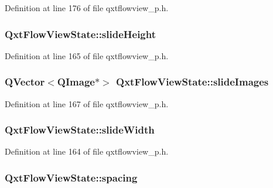 Definition at line 176 of file qxtflowview\-\_\-p.\-h.

\hypertarget{class_qxt_flow_view_state_ad99364d285780d8b4c2d4b50dbe86fdc}{
\subsubsection[{slide\-Height}]{ Qxt\-Flow\-View\-State\-::slide\-Height}}\label{class_qxt_flow_view_state_ad99364d285780d8b4c2d4b50dbe86fdc}


Definition at line 165 of file qxtflowview\-\_\-p.\-h.

\hypertarget{class_qxt_flow_view_state_ae0efba9dbd03593eca649060d96d0073}{
\subsubsection[{slide\-Images}]{\setlength{\rightskip}{0pt plus 5cm}Q\-Vector$<$Q\-Image$\ast$$>$ Qxt\-Flow\-View\-State\-::slide\-Images}}\label{class_qxt_flow_view_state_ae0efba9dbd03593eca649060d96d0073}


Definition at line 167 of file qxtflowview\-\_\-p.\-h.

\hypertarget{class_qxt_flow_view_state_a7f91c4d0a9c63db943552ab450c380b3}{
\subsubsection[{slide\-Width}]{ Qxt\-Flow\-View\-State\-::slide\-Width}}\label{class_qxt_flow_view_state_a7f91c4d0a9c63db943552ab450c380b3}


Definition at line 164 of file qxtflowview\-\_\-p.\-h.

\hypertarget{class_qxt_flow_view_state_ad67cb493f65ff79cec2f243cc994ba96}{
\subsubsection[{spacing}]{ Qxt\-Flow\-View\-State\-::spacing}}\label{class_qxt_flow_view_state_ad67cb493f65ff79cec2f243cc994ba96}


